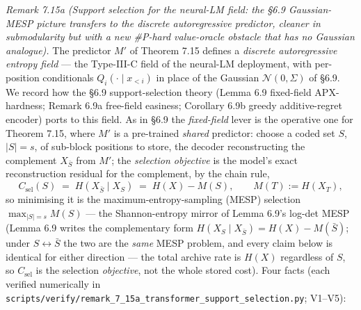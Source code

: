 \documentclass[
]{article}
\begin{document}
\emph{Remark 7.15a (Support selection for the neural-LM field: the §6.9
Gaussian-MESP picture transfers to the discrete autoregressive predictor,
cleaner in submodularity but with a new \#P-hard value-oracle obstacle that
has no Gaussian analogue).} The predictor $M'$ of Theorem 7.15 defines a
\emph{discrete autoregressive entropy field} --- the Type-III-C field of the
neural-LM deployment, with per-position conditionals
$Q_i(\cdot\mid x_{<i})$ in place of the Gaussian $\mathcal N(0,\Sigma)$ of
§6.9. We record how the §6.9 support-selection theory (Lemma 6.9 fixed-field
APX-hardness; Remark 6.9a free-field easiness; Corollary 6.9b greedy
additive-regret encoder) ports to this field. As in §6.9 the
\emph{fixed-field} lever is the operative one for Theorem 7.15, where $M'$
is a pre-trained \emph{shared} predictor: choose a coded set $S$, $|S|=s$,
of sub-block positions to store, the decoder reconstructing the complement
$X_{\bar S}$ from $M'$; the \emph{selection objective} is the model's exact
reconstruction residual for the complement, by the chain rule,
\[
C_{\mathrm{sel}}(S) \;=\; H(X_{\bar S}\mid X_S)
\;=\; H(X) - M(S), \qquad M(T):=H(X_T),
\]
so minimising it is the maximum-entropy-sampling (MESP) selection
$\max_{|S|=s} M(S)$ --- the Shannon-entropy mirror of Lemma 6.9's log-det
MESP (Lemma 6.9 writes the complementary form $H(X_S\mid X_{\bar S})=H(X)-
M(\bar S)$; under $S\leftrightarrow\bar S$ the two are the \emph{same} MESP
problem, and every claim below is identical for either direction --- the
total archive rate is $H(X)$ regardless of $S$, so $C_{\mathrm{sel}}$ is the
selection \emph{objective}, not the whole stored cost). Four facts (each
verified numerically in
\texttt{scripts/verify/remark\_7\_15a\_transformer\_support\_selection.py};
V1--V5):
\end{document}
